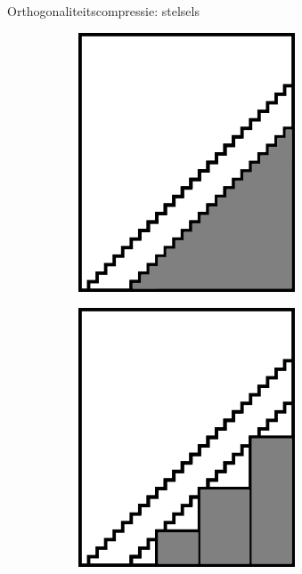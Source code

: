\documentclass[t,12pt,dutch
\ifx\beamermode\undefined\else,\beamermode\fi
]{beamer}
\begin{document}
\begin{frame}{Orthogonaliteitscompressie: stelsels}
\begin{figure}[]
\begin{subfigure}{0.3\textwidth}
  \includegraphics[width=0.9\linewidth]{images/orthogonality_compression3.png}
\end{subfigure}
\begin{subfigure}{0.3\textwidth}
  \centering
  \includegraphics[width=0.9\linewidth]{images/orthogonality_compression4.png}
\end{subfigure}
\end{figure}

\end{frame}
\end{document}
